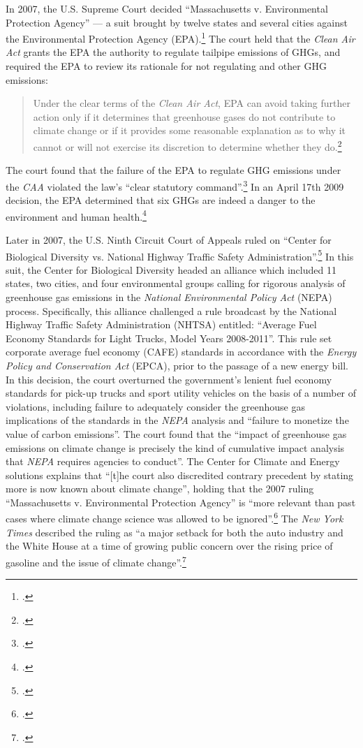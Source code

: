 In 2007, the U.S. Supreme Court decided ``Massachusetts v. Environmental Protection Agency'' --- a suit brought by twelve states and several cities against the Environmental Protection Agency (EPA).\footcite[][]{MassVEPA}
The court held that the \emph{Clean Air Act} grants the EPA the authority to regulate tailpipe emissions of GHGs, and required the EPA to review its rationale for not regulating  and other GHG emissions:
\begin{quote}
Under the clear terms of the \emph{Clean Air Act}, EPA can avoid taking further action only if it determines that greenhouse gases do not contribute to climate change or if it provides some reasonable explanation as to why it cannot or will not exercise its discretion to determine whether they do.\footcite[][p. 30]{MassVEPA}
\end{quote}
The court found that the failure of the EPA to regulate GHG emissions under the \emph{CAA} violated the law's ``clear statutory command''.\footcite[See: ][]{EPAhaspower}
In an April 17th 2009 decision, the EPA determined that six GHGs are indeed a danger to the environment and human health.\footcite[][]{GreenFigleaf}



Later in 2007, the U.S. Ninth Circuit Court of Appeals ruled on ``Center for Biological Diversity vs. National Highway Traffic Safety Administration''.\footcite[][]{9thcircuitHighway}
In this suit, the Center for Biological Diversity headed an alliance which included 11 states, two cities, and four environmental groups calling for rigorous analysis of greenhouse gas emissions in the \emph{National Environmental Policy Act} (NEPA) process. 
Specifically, this alliance challenged a rule broadcast by the National Highway Traffic Safety Administration (NHTSA) entitled: ``Average Fuel Economy Standards for Light Trucks, Model Years 2008-2011''.
This rule set corporate average fuel economy (CAFE) standards in accordance with the \emph{Energy Policy and Conservation Act} (EPCA), prior to the passage of a new energy bill.  
In this decision, the court overturned the government's lenient fuel economy standards for pick-up trucks and sport utility vehicles on the basis of a number of violations, including failure to adequately consider the greenhouse gas implications of the standards in the \emph{NEPA} analysis and ``failure to monetize the value of carbon emissions''.
The court found that the ``impact of greenhouse gas emissions on climate change is precisely the kind of cumulative impact analysis that \emph{NEPA} requires agencies to conduct''.
The Center for Climate and Energy solutions explains that ``[t]he court also discredited contrary precedent by stating more is now known about climate change'', holding that the 2007 ruling ``Massachusetts v. Environmental Protection Agency'' is ``more relevant than past cases where climate change science was allowed to be ignored''.\footcite[][]{NEPACases}
The \emph{New York Times} described the ruling as ``a major setback for both the auto industry and the White House at a time of growing public concern over the rising price of gasoline and the issue of climate change''.\footcite[][]{CourtRejectsTruckStandards}



